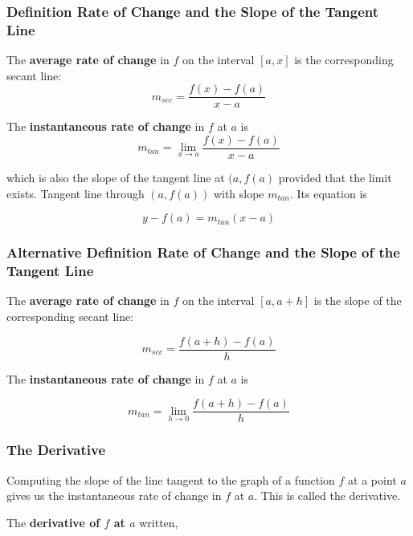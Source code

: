 \documentclass{report}
\begin{document}
\newpage

\subsubsection{Definition Rate of Change and the Slope of the Tangent Line}

The \textbf{average rate of change} in $f$ on the interval $[a,x]$ is the corresponding secant line:
\begin{equation*}
    m_{sec}=\frac{f(x)-f(a)}{x-a}
\end{equation*}

The \textbf{instantaneous rate of change } in $f$ at $a$ is 
\begin{equation*}
    m_{tan}=\lim_{x \to a } \frac{f(x)-f(a)}{x-a}
\end{equation*}

which is also the slope of the tangent line at $(a,f(a)$ provided that the limit exists. Tangent line through $(a,f(a))$ with slope $m_{tan}$. Its equation is

\begin{equation*}
    y-f(a)=m_{tan}(x-a)
\end{equation*}

\subsubsection{Alternative Definition Rate of Change and the Slope of the Tangent Line}
The \textbf{average rate of change} in $f$ on the interval $[a, a +h]$ is the slope of the corresponding secant line:

\begin{equation*}
    m_{sec}=\frac{f(a+h)-f(a)}{h}
\end{equation*}

The \textbf{instantaneous rate of change} in $f$ at $a$ is 

\begin{equation*}
    m_{tan}=\lim_{h \to 0} \frac{f(a+h)-f(a)}{h}
\end{equation*}

\subsubsection{The Derivative}
Computing the slope of the line tangent to the graph of a function $f$ at a point $a$ gives us the instantaneous  rate of change in $f$ at $a$. This is called the derivative.

The \textbf{derivative of $f$ at $a$} written,
\end{document}
